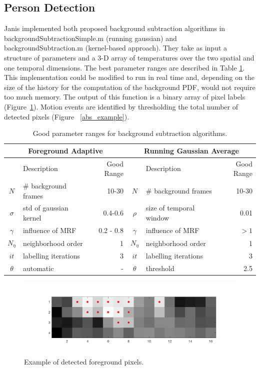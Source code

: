 \documentclass[12pt,oneside]{article} %
\begin{document}
\subsection{Person Detection}
Janis implemented both proposed background subtraction algorithms in backgroundSubtractionSimple.m 
(running gaussian) and backgroundSubtraction.m (kernel-based approach).
They take as input a structure of parameters
and a 3-D array of temperatures over the two spatial and one temporal dimensions. 
The best parameter ranges are described in Table \ref{bs_paramstable}.
This implementation could
be modified to run in real time and, depending on the size of the history for the computation of the background
PDF, would not require too much memory. The output of this function is a binary array of pixel labels 
(Figure~\ref{foregroundexample}). Motion events are identified by
thresholding the total number of detected pixels (Figure~ \ref{abs_example}).
\begin{table}\begin{tabular}{|clr|clr|}
\hline
\multicolumn{3}{|c|}{Foreground Adaptive} & \multicolumn{3}{|c|}{Running Gaussian Average}\\
\hline
& Description & Good Range & & Description & Good Range\\
\hline
$N$ & \# background frames & 10-30 & $N$ & \# background frames & 10-30\\
$\sigma$ & std of gaussian kernel & 0.4-0.6 & $\rho$ & size of temporal window & 0.01\\
$\gamma$ & influence of MRF & 0.2 - 0.8 & $\gamma$ & influence of MRF & $>1$\\
$N_\eta$ & neighborhood order & 1 & $N_\eta$ & neighborhood order & 1\\
$it$ & labelling iterations & 3 & $it$ & labelling iterations & 3\\
$\theta$ & automatic & - & $\theta$ & threshold & 2.5\\
\hline
\end{tabular}
\caption{Good parameter ranges for background subtraction algorithms.}
\label{bs_paramstable}
\end{table}

\begin{figure}[htb] 
\centering
\includegraphics[scale=0.45]{images/foreground_example.png}
\caption{Example of detected foreground pixels.}
\label{foregroundexample}
\end{figure}
\end{document}
